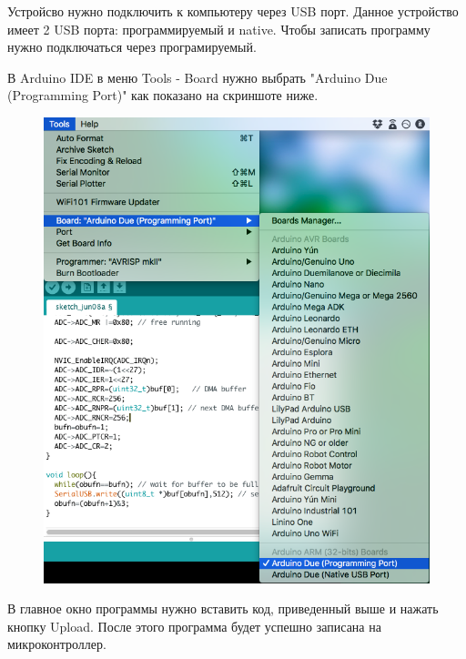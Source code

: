 \documentclass[../paper.tex]{subfiles}
\begin{document}
Устройсво нужно подключить к компьютеру через USB порт. Данное устройство имеет 2 USB порта: программируемый и native. Чтобы записать программу нужно подключаться через програмируемый.

В Arduino IDE в меню Tools - Board нужно выбрать "Arduino Due (Programming Port)" как показано на скриншоте ниже.
\begin{figure}[H]
\centering
\includegraphics[width=16cm]{images/ard-board-select.png}
\end{figure}

В главное окно программы нужно вставить код, приведенный выше и нажать кнопку Upload. После этого программа будет успешно записана на микроконтроллер.
\end{document}

